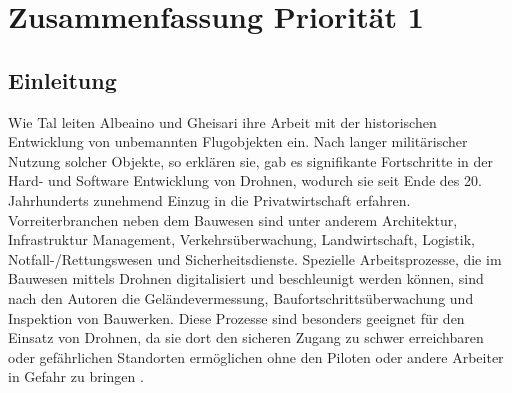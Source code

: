 \chapter{Zusammenfassung Priorität 1}\label{ch:summary2}

\section{Einleitung}

Wie Tal leiten Albeaino und Gheisari ihre Arbeit mit der historischen Entwicklung von unbemannten Flugobjekten ein.
Nach langer militärischer Nutzung solcher Objekte, so erklären sie, gab es signifikante Fortschritte in der Hard- und Software Entwicklung von Drohnen, wodurch sie seit Ende des 20. Jahrhunderts zunehmend Einzug in die Privatwirtschaft erfahren.
Vorreiterbranchen neben dem Bauwesen sind unter anderem Architektur, Infrastruktur Management, Verkehrsüberwachung, Landwirtschaft, Logistik, Notfall-/Rettungswesen und Sicherheitsdienste.
Spezielle Arbeitsprozesse, die im Bauwesen mittels Drohnen digitalisiert und beschleunigt werden können, sind nach den Autoren die Geländevermessung, Baufortschrittsüberwachung und Inspektion von Bauwerken.
Diese Prozesse sind besonders geeignet für den Einsatz von Drohnen, da sie dort den sicheren Zugang zu schwer erreichbaren oder gefährlichen Standorten ermöglichen ohne den Piloten oder andere Arbeiter in Gefahr zu bringen \cite[S. 84--85]{abaeano2021trends}.




